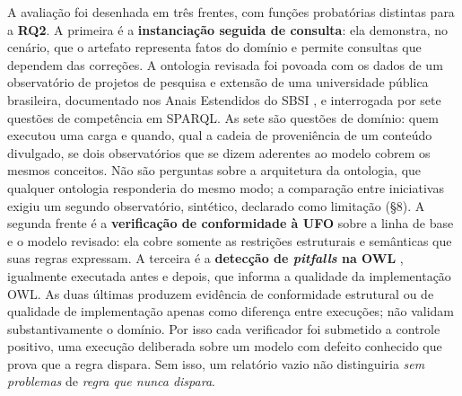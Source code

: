 A avaliação foi desenhada em três frentes, com funções probatórias distintas para a \textbf{RQ2}. A primeira é a \textbf{instanciação seguida de consulta}: ela demonstra, no cenário, que o artefato representa fatos do domínio e permite consultas que dependem das correções. A ontologia revisada foi povoada com os dados de um observatório de projetos de pesquisa e extensão de uma universidade pública brasileira, documentado nos Anais Estendidos do SBSI \cite{sbsi_estendido}, e interrogada por sete questões de competência em SPARQL. As sete são questões de domínio: quem executou uma carga e quando, qual a cadeia de proveniência de um conteúdo divulgado, se dois observatórios que se dizem aderentes ao modelo cobrem os mesmos conceitos. Não são perguntas sobre a arquitetura da ontologia, que qualquer ontologia responderia do mesmo modo; a comparação entre iniciativas exigiu um segundo observatório, sintético, declarado como limitação (\S{}8). A segunda frente é a \textbf{verificação de conformidade à UFO} sobre a linha de base e o modelo revisado: ela cobre somente as restrições estruturais e semânticas que suas regras expressam. A terceira é a \textbf{detecção de \textit{pitfalls} na OWL} \cite{poveda2014oops}, igualmente executada antes e depois, que informa a qualidade da implementação OWL. As duas últimas produzem evidência de conformidade estrutural ou de qualidade de implementação apenas como diferença entre execuções; não validam substantivamente o domínio. Por isso cada verificador foi submetido a controle positivo, uma execução deliberada sobre um modelo com defeito conhecido que prova que a regra dispara. Sem isso, um relatório vazio não distinguiria \textit{sem problemas} de \textit{regra que nunca dispara}.
